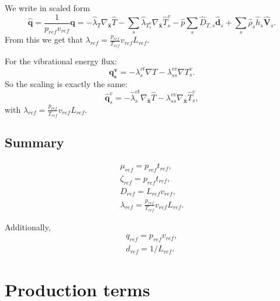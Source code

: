 \documentclass[a4paper,11pt,english]{article}
\begin{document}
We write in scaled form
\begin{equation}
     \hat{\mathbf{q}} = \frac{1}{p_{ref}v_{ref}}{\mathbf{q}} = -\hat{\lambda}_T \nabla_{\hat{\mathbf{x}}} \hat{T} - \sum_{s}\hat{\lambda}_{T^v_s}\nabla_{\hat{\mathbf{x}}} \hat{T}^v_s
     - \hat{p} \sum_s \hat{D}_{T,s} \hat{\mathbf{d}}_s + \sum_s \hat{\rho}_s \hat{h}_s \hat{\mathbf{V}}_s.
\end{equation}
From this we get that $\lambda_{ref} = \frac{p_{ref}}{T_{ref}}v_{ref}L_{ref}$.

For the vibrational energy flux:
\begin{equation}
     \mathbf{q^v_s} = -\lambda^{vt}_s \nabla T - \lambda^{vv}_{ss} \nabla T^v_s.
\end{equation}
So the scaling is exactly the same:
\begin{equation}
     \hat{\mathbf{q}}^v_s = -\hat{\lambda}^{vt}_s \nabla_{\hat{\mathbf{x}}} \hat{T} - \lambda^{vv}_{ss} \nabla_{\hat{\mathbf{x}}} \hat{T}^v_s,
\end{equation}
with $\lambda_{ref} = \frac{p_{ref}}{T_{ref}}v_{ref}L_{ref}$.


\subsection{Summary}
\begin{align}
     \mu_{ref} = p_{ref} t_{ref}, \\
     \zeta_{ref} = p_{ref} t_{ref},\\
     D_{ref} = L_{ref} v_{ref},\\
     \lambda_{ref} = \frac{p_{ref}}{T_{ref}}v_{ref}L_{ref}.
\end{align}

Additionally,
\begin{align}
     q_{ref} = p_{ref}v_{ref},\\
     d_{ref} = 1 / L_{ref}.
\end{align}
\section{Production terms}
\end{document}
